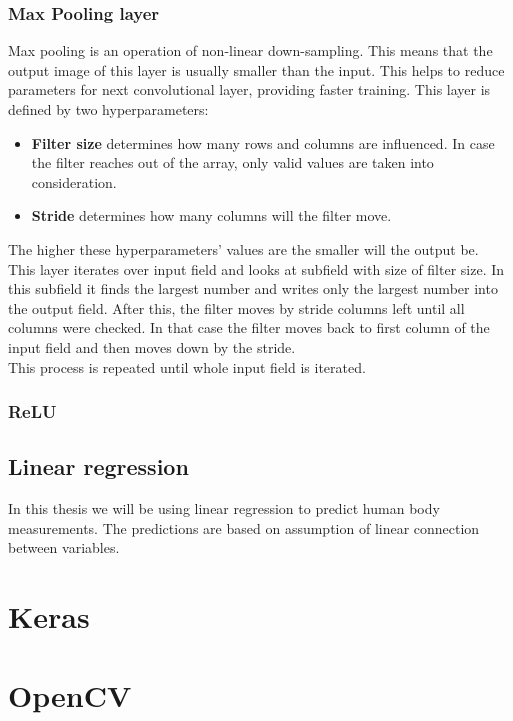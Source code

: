 \subsubsection{Max Pooling layer}
Max pooling is an operation of non-linear down-sampling. This means that the output image of this layer is usually smaller than the input. This helps to reduce parameters for next convolutional layer, providing faster training.  This layer is defined by two hyperparameters:
\begin{itemize}
	\item \textbf{Filter size} determines how many rows and columns are influenced. In case the filter reaches out of the array, only valid values are taken into consideration.
	\item \textbf{Stride} determines how many columns will the filter move.
\end{itemize}
The higher these hyperparameters' values are the smaller will the output be.\\
This layer iterates over input field and looks at subfield with size of filter size. In this subfield it finds the largest number and writes only the largest number into the output field. After this, the filter moves by stride columns left until all columns were checked. In that case the filter moves back to first column of the input field and then moves down by the stride.\\ This process is repeated until whole input field is iterated.
\subsubsection{ReLU}
\subsection{Linear regression}
In this thesis we will be using linear regression to predict human body measurements. The predictions are based on assumption of linear connection between variables. 

\section{Keras}
\section{OpenCV}